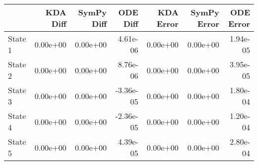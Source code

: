 \begin{tabular}{lrrrrrr}
\toprule
{} &  KDA Diff &  SymPy Diff &  ODE Diff &  KDA Error &  SymPy Error &  ODE Error \\
\midrule
State 1 &  0.00e+00 &    0.00e+00 &  4.61e-06 &   0.00e+00 &     0.00e+00 &   1.94e-05 \\
State 2 &  0.00e+00 &    0.00e+00 &  8.76e-06 &   0.00e+00 &     0.00e+00 &   3.95e-05 \\
State 3 &  0.00e+00 &    0.00e+00 & -3.36e-05 &   0.00e+00 &     0.00e+00 &   1.80e-04 \\
State 4 &  0.00e+00 &    0.00e+00 & -2.36e-05 &   0.00e+00 &     0.00e+00 &   1.20e-04 \\
State 5 &  0.00e+00 &    0.00e+00 &  4.39e-05 &   0.00e+00 &     0.00e+00 &   2.80e-04 \\
\bottomrule
\end{tabular}
